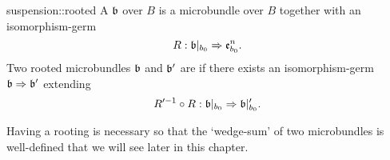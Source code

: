\begin{mydefinition}{suspension::rooted}{}
    A  $\mathfrak{b}$ over $B$ is a microbundle
    over $B$ together with an isomorphism-germ
    \[ R: \mathfrak{b}\vert_{b_0} \Rightarrow{} \mathfrak{e}^{n}_{b_0}. \]
    Two rooted microbundles $\mathfrak{b}$ and $\mathfrak{b}'$ are 
    if there exists an isomorphism-germ $\mathfrak{b} \Rightarrow{} \mathfrak{b}'$ extending
    \[ R'^{-1} \circ R: \mathfrak{b}\vert_{b_0} \Rightarrow{} \mathfrak{b}\vert_{b_0}'. \]
\end{mydefinition}

\begin{myparagraph}
    Having a rooting is necessary
    so that the `wedge-sum' of two microbundles is well-defined
    that we will see later in this chapter.
\end{myparagraph}